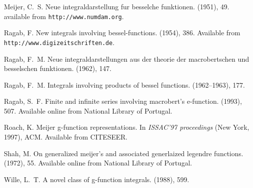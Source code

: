 \documentclass[11pt]{article}
\begin{document}
\begin{thebibliography}{10}
{\sc Meijer, C.~S.}
\newblock Neue integraldarstellung fur besselche funktionen.
 (1951), 49.
\newblock available from \texttt{http://www.numdam.org}.

{\sc Ragab, F.}
\newblock New integrals involving bessel-functions.
 (1954), 386.
\newblock Available from \texttt{http://www.digizeitschriften.de}.

{\sc Ragab, F.~M.}
\newblock Neue integraldarstellungen aus der theorie der macrobertschen und
  besselschen funktionen.
 (1962), 147.

{\sc Ragab, F.~M.}
\newblock Integrals involving products of bessel functions.
 (1962--1963), 177.

{\sc Ragab, S.~F.}
\newblock Finite and infinite series involving macrobert's e-function.
 (1993), 507.
\newblock Available online from National Library of Portugal.

{\sc Roach, K.}
\newblock Meijer g-function representations.
\newblock In {\em ISSAC'97 proceedings\/} (New York, 1997), ACM.
\newblock Available from CITESEER.

{\sc Shah, M.}
\newblock On generalized meijer's and associated generlaized legendre
  functions.
 (1972), 55.
\newblock Available online from National Library of Portugal.

{\sc Wille, L.~T.}
\newblock A novel class of g-function integrals.
 (1988), 599.

\end{thebibliography}
\end{document}
